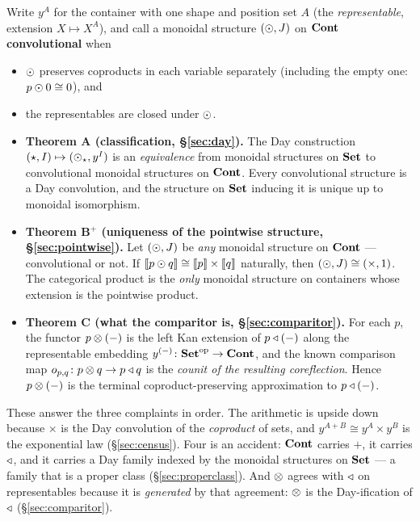 Write $y^A$ for the container with one shape and position set $A$ (the
\emph{representable}, extension $X\mapsto X^A$), and call a monoidal structure
$(\mathbin{\odot},J)$ on $\mathbf{Cont}$ \textbf{convolutional} when

\begin{itemize}[nosep]
\item[\textbf{(D1)}] $\mathbin{\odot}$ preserves coproducts in each variable separately
  (including the empty one: $p\mathbin{\odot} 0\cong 0$), and
\item[\textbf{(D2)}] the representables are closed under $\mathbin{\odot}$.
\end{itemize}

\begin{itemize}
\item \textbf{Theorem A (classification, §\ref{sec:day}).} The Day construction
  $(\star,I)\mapsto(\mathbin{\odot}_\star, y^I)$ is an \emph{equivalence} from monoidal
  structures on $\mathbf{Set}$ to convolutional monoidal structures on $\mathbf{Cont}$. Every
  convolutional structure is a Day convolution, and the structure on $\mathbf{Set}$
  inducing it is unique up to monoidal isomorphism.

\item \textbf{Theorem B$^+$ (uniqueness of the pointwise structure,
  §\ref{sec:pointwise}).} Let $(\mathbin{\odot},J)$ be \emph{any} monoidal structure on
  $\mathbf{Cont}$ --- convolutional or not. If $\llbracket p\mathbin{\odot} q \rrbracket\cong\llbracket p \rrbracket\times\llbracket q \rrbracket$
  naturally, then $(\mathbin{\odot},J)\cong(\times,1)$. The categorical product is the
  \emph{only} monoidal structure on containers whose extension is the pointwise
  product.

\item \textbf{Theorem C (what the comparitor is, §\ref{sec:comparitor}).}
  For each $p$, the functor $p\mathbin{\otimes}(-)$ is the left Kan extension of $p\mathbin{\triangleleft}(-)$
  along the representable embedding $y^{(-)}\colon\mathbf{Set}^{\mathrm{op}}\to\mathbf{Cont}$,
  and the known comparison map $o_{p,q}\colon p\mathbin{\otimes} q\to p\mathbin{\triangleleft} q$ is the
  \emph{counit of the resulting coreflection}. Hence $p\mathbin{\otimes}(-)$ is the terminal
  coproduct-preserving approximation to $p\mathbin{\triangleleft}(-)$.
\end{itemize}

These answer the three complaints in order. The arithmetic is upside down
because $\times$ is the Day convolution of the \emph{coproduct} of sets, and
$y^{A+B}\cong y^A\times y^B$ is the exponential law (§\ref{sec:census}). Four is
an accident: $\mathbf{Cont}$ carries $+$, it carries $\mathbin{\triangleleft}$, and it carries a Day family
indexed by the monoidal structures on $\mathbf{Set}$ --- a family that is a proper class
(§\ref{sec:properclass}). And $\mathbin{\otimes}$ agrees with $\mathbin{\triangleleft}$ on representables
because it is \emph{generated} by that agreement: $\mathbin{\otimes}$ is the Day-ification of
$\mathbin{\triangleleft}$ (§\ref{sec:comparitor}).

